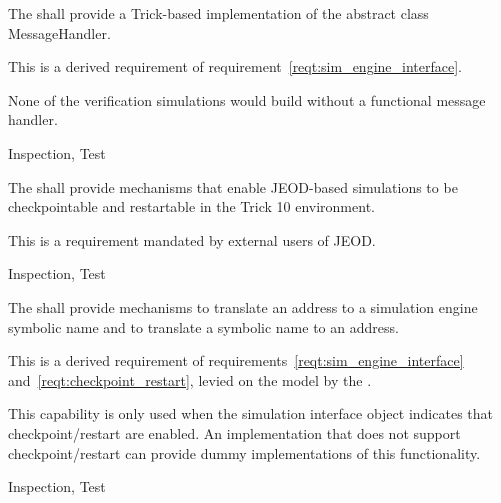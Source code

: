 \label{reqt:trick_message_handler}
\begin{description:}
\item[Requirement]
  The \ModelDesc shall provide a Trick-based implementation of the abstract
  class MessageHandler.
\item[Rationale]
  This is a derived requirement of requirement~\ref{reqt:sim_engine_interface}.

  None of the verification simulations would build without a functional
  message handler.
\item[Verification]
  Inspection, Test 
\end{description:}

\label{reqt:checkpoint_restart}
\begin{description:}
\item[Requirement]
  The \ModelDesc shall provide mechanisms that enable JEOD-based simulations
  to be checkpointable and restartable in the Trick 10 environment.
\item[Rationale]
  This is a requirement mandated by external users of JEOD.
\item[Verification]
  Inspection, Test 
\end{description:}


\label{reqt:addr_name_xlate}
\begin{description:}
\item[Requirement]
  The \ModelDesc shall provide mechanisms to translate an address
  to a simulation engine symbolic name and to translate a symbolic name
  to an address.
\item[Rationale]
  This is a derived requirement of
  requirements~\ref{reqt:sim_engine_interface}
  and~\ref{reqt:checkpoint_restart},
  levied on the model by the \CONTAINER.
\item[Discussion]
  This capability is only used when the simulation interface object
  indicates that checkpoint/restart are enabled. An implementation that
  does not support checkpoint/restart can provide dummy implementations
  of this functionality.
\item[Verification]
  Inspection, Test 
\end{description:}



